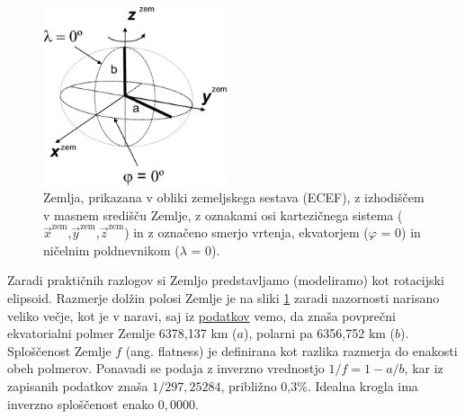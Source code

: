 \begin{figure}
	\vspace{-60pt}
	\begin{center}
		\includegraphics[width=0.48\textwidth]{Predavanja/05_SatLastPolozaj/figs/SkicaECEF.png}
	\end{center}
	\vspace{-10pt}
	\caption{Zemlja, prikazana v obliki zemeljskega sestava (ECEF), z izhodiščem v masnem središču Zemlje, z oznakami osi kartezičnega sistema ($\vec{x}^{\textrm{zem}}$,$\vec{y}^{\textrm{zem}}$,$\vec{z}^{\textrm{zem}}$) in z označeno smerjo vrtenja, ekvatorjem ($\varphi$ = 0\degree) in ničelnim poldnevnikom ($\lambda$ = 0\degree).}
	\label{Fig_PrikazECEF}
	\vspace{130pt}
\end{figure}



Zaradi praktičnih razlogov si Zemljo predstavljamo (modeliramo) kot rotacijski elipsoid.
Razmerje dolžin polosi Zemlje je na sliki \ref{Fig_PrikazECEF} zaradi nazornosti narisano veliko večje, kot je v naravi, saj iz  \href{http://nssdc.gsfc.nasa.gov/planetary/factsheet/earthfact.html}{podatkov}
vemo, da znaša povprečni ekvatorialni polmer Zemlje 6378,137 km ($a$), polarni pa 6356,752 km ($b$). Sploščenost Zemlje $f$ (ang. flatness) je definirana kot razlika razmerja do enakosti obeh polmerov. Ponavadi se podaja z inverzno vrednostjo $1/f = 1 - a/b$, kar iz zapisanih podatkov znaša $1/297,25284$, približno 0,3\%. Idealna krogla ima inverzno sploščenost enako $0,0000$. 

